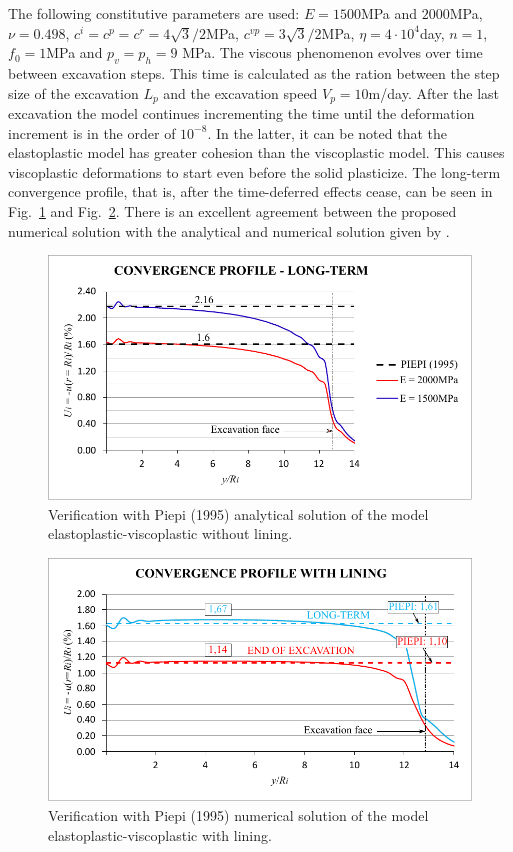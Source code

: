 \documentclass[Journal,letterpaper]{ascelike-new}
\begin{document}
The following constitutive parameters are used: $E=1500$MPa and $2000$MPa, $\nu=0.498$, $c^i=c^p=c^r =4\sqrt{3}/2$MPa, $ c^{vp}=3\sqrt{3}/2$MPa, $\eta = 4 \cdot 10^4$day, $n=1$, $f_0=1$MPa and $p_v=p_h=9$ MPa. The viscous phenomenon evolves over time between excavation steps. This time is calculated as the ration between the step size of the excavation $L_p$ and the excavation speed $V_p = 10$m/day. After the last excavation the model continues incrementing the time until the deformation increment is in the order of $10^{-8}$. In the latter, it can be noted that the elastoplastic model has greater cohesion than the viscoplastic model. This causes viscoplastic deformations to start even before the solid plasticize. The long-term convergence profile, that is, after the time-deferred effects cease, can be seen in Fig.~\ref{convergence_profile_piepi} and Fig.~\ref{convergence_profile_piepi_with_lining}. There is an excellent agreement between the proposed numerical solution with the analytical and numerical solution given by .

\begin{figure}
	\centering
	\includegraphics[scale = 1.0]{convergence_profile_piepi.pdf}
	\caption{\label{convergence_profile_piepi}Verification with Piepi (1995) analytical solution of the model elastoplastic-viscoplastic without lining.}
\end{figure}

\begin{figure}
	\centering
	\includegraphics[scale = 1.0]{convergence_profile_piepi_with_lining.pdf}
	\caption{\label{convergence_profile_piepi_with_lining}Verification with Piepi (1995) numerical solution of the model elastoplastic-viscoplastic with lining.}
\end{figure}
\end{document}
